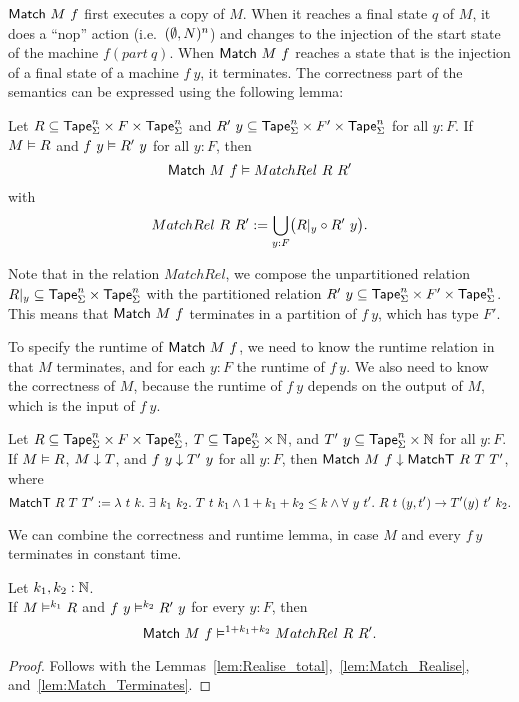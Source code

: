 $\mathsf{Match}~M~f$ first executes a copy of $M$.  When it reaches a final state $q$ of $M$, it does a ``nop'' action (i.e.\ $(\emptyset,N)^n$) and changes
to the injection of the start state of the machine $f(part~q)$.  When $\mathsf{Match}~M~f$ reaches a state that is the injection of a final state of a
machine $f~y$, it terminates.  The correctness part of the semantics can be expressed using the following lemma:

\begin{lemma}
  \label{lem:Match_Realise}
  Let $R \subseteq \mathsf{Tape}_\Sigma^n \times F \times \mathsf{Tape}_\Sigma^n$ and $R'~y \subseteq \mathsf{Tape}_\Sigma^n \times F' \times \mathsf{Tape}_\Sigma^n$ for all $y:F$.
  If $M \mathrel{\vDash} R$ and $f~y \mathrel{\vDash} R'~y$ for all $y:F$, then
  \[
    \mathsf{Match}~M~f \mathrel{\vDash} MatchRel~R~R'
  \]
  with
  \[
    MatchRel~R~R' := \bigcup_{y:F} \bigl( R{|}_{y} \circ R'~y \bigr).
  \]
\end{lemma}

Note that in the relation $MatchRel$, we compose the unpartitioned relation $R {|}_{y} \subseteq \mathsf{Tape}_\Sigma^n \times \mathsf{Tape}_\Sigma^n$ with the
partitioned relation $R'~y \subseteq \mathsf{Tape}_\Sigma^n \times F' \times \mathsf{Tape}_\Sigma^n$.  This means that $\mathsf{Match}~M~f$ terminates in a partition of
$f~y$, which has type $F'$.

To specify the runtime of $\mathsf{Match}~M~f$, we need to know the runtime relation in that $M$ terminates, and for each $y:F$ the runtime of $f~y$.
We also need to know the correctness of $M$, because the runtime of $f~y$ depends on the output of $M$, which is the input of $f~y$.

\begin{lemma}
  \label{lem:Match_Terminates}
  Let $R \subseteq \mathsf{Tape}_\Sigma^n \times F \times \mathsf{Tape}_\Sigma^n$, $T \subseteq \mathsf{Tape}_\Sigma^n \times \mathbb{N}$, and
  $T'~y \subseteq \mathsf{Tape}_\Sigma^n \times \mathbb{N}$ for all $y:F$.  If $M \mathrel{\vDash} R$, $M \mathrel{\downarrow} T$, and $f~y \mathrel{\downarrow} T'~y$ for all $y:F$, then
  $\mathsf{Match}~M~f \mathrel{\downarrow} \mathsf{MatchT}~R~T~T'$, where
  \[
    \mathsf{MatchT}~R~T~T' :=
    \lambda~t~k.~ \exists~k_1~k_2.~T~t~k_1 \land 1+k_1+k_2 \le k \land
      \forall~y~t'.~ R~t~(y,t') \rightarrow T'(y)~t'~k_2.
  \]
\end{lemma}

We can combine the correctness and runtime lemma, in case $M$ and every $f~y$ terminates in constant time.
\begin{lemma}
  \label{lem:Match_RealiseIn}
  Let $k_1, k_2:\mathbb{N}$.\\
  If $M \mathrel{\vDash^{k_1}} R$ and $f~y \mathrel{\vDash^{k_2}} R'~y$ for every $y:F$, then
  \[ \mathsf{Match}~M~f \mathrel{\vDash^{1+k_1+k_2}} MatchRel~R~R'. \]
\end{lemma}
\begin{proof}
  Follows with the Lemmas~\ref{lem:Realise_total},~\ref{lem:Match_Realise}, and~\ref{lem:Match_Terminates}.
\end{proof}


